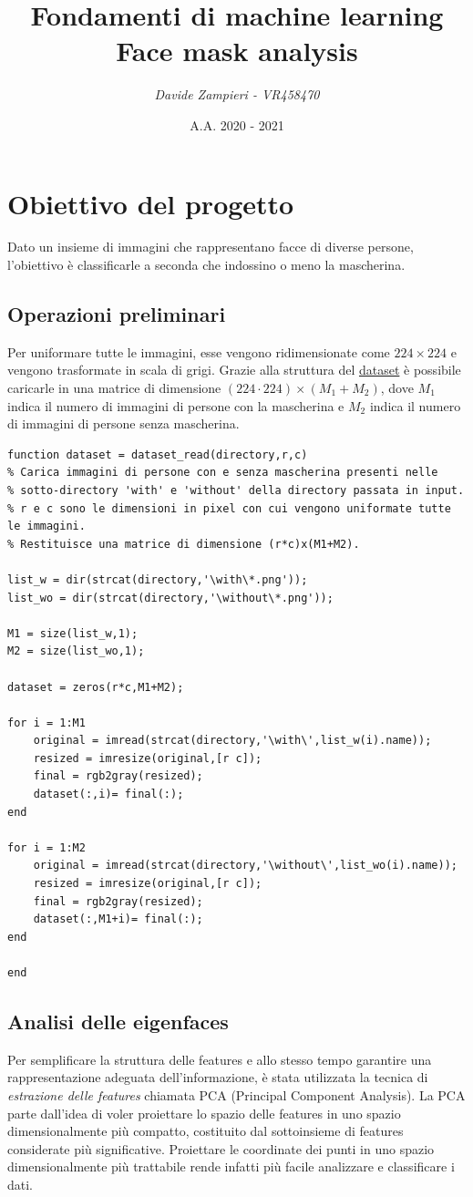 \documentclass[12pt]{article}
\title{\textbf{Fondamenti di machine learning} \\ Face mask analysis}
\author{\textit{Davide Zampieri - VR458470}}
\date{A.A. 2020 - 2021}
\begin{document}
\maketitle

\section{Obiettivo del progetto}
Dato un insieme di immagini che rappresentano facce di diverse persone, l'obiettivo è classificarle a seconda che indossino o meno la mascherina.

\subsection{Operazioni preliminari}
Per uniformare tutte le immagini, esse vengono ridimensionate come $224 \times 224$ e vengono trasformate in scala di grigi. Grazie alla struttura del \href{https://www.kaggle.com/ashishjangra27/face-mask-12k-images-dataset}{dataset} è possibile caricarle in una matrice di dimensione $(224 \cdot 224) \times (M_1 + M_2)$, dove $M_1$ indica il numero di immagini di persone con la mascherina e $M_2$ indica il numero di immagini di persone senza mascherina.
\begin{verbatim}
function dataset = dataset_read(directory,r,c)
% Carica immagini di persone con e senza mascherina presenti nelle
% sotto-directory 'with' e 'without' della directory passata in input.
% r e c sono le dimensioni in pixel con cui vengono uniformate tutte le immagini.
% Restituisce una matrice di dimensione (r*c)x(M1+M2).

list_w = dir(strcat(directory,'\with\*.png'));
list_wo = dir(strcat(directory,'\without\*.png'));

M1 = size(list_w,1);
M2 = size(list_wo,1);

dataset = zeros(r*c,M1+M2);

for i = 1:M1
    original = imread(strcat(directory,'\with\',list_w(i).name));
    resized = imresize(original,[r c]);
    final = rgb2gray(resized);
    dataset(:,i)= final(:);
end

for i = 1:M2
    original = imread(strcat(directory,'\without\',list_wo(i).name));
    resized = imresize(original,[r c]);
    final = rgb2gray(resized);
    dataset(:,M1+i)= final(:);
end

end
\end{verbatim}

\subsection{Analisi delle eigenfaces}
Per semplificare la struttura delle features e allo stesso tempo garantire una rappresentazione adeguata dell'informazione, è stata utilizzata la tecnica di \textit{estrazione delle features} chiamata PCA (Principal Component Analysis). La PCA parte dall'idea di voler proiettare lo spazio delle features in uno spazio dimensionalmente più compatto, costituito dal sottoinsieme di features considerate più significative. Proiettare le coordinate dei punti in uno spazio dimensionalmente più trattabile rende infatti più facile analizzare e classificare i dati.
\end{document}

